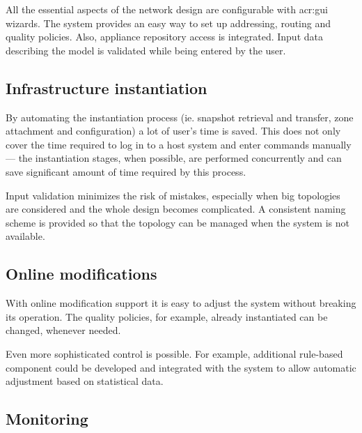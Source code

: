 \documentclass[11pt]{book}
\begin{document}
        All the essential aspects of the network design are configurable with \gls{acr:gui} wizards. The system provides an easy
        way to set up addressing, routing and quality policies. Also, appliance repository access is integrated. Input
        data describing the model is validated while being entered by the user. 


      \subsection{Infrastructure instantiation}
      \label{sub:uc:enhance:instantiation}

        By automating the instantiation process (ie. snapshot retrieval and transfer, zone attachment and configuration)
        a lot of user's time is saved. This does not only cover the time required to log in to a host system and enter
        commands manually --- the instantiation stages, when possible, are performed concurrently and can save
        significant amount of time required by this process.

        Input validation minimizes the risk of mistakes, especially when big topologies are considered and the whole
        design becomes complicated. A consistent naming scheme is provided so that the topology can be managed when the
        system is not available.



      \subsection{Online modifications}
      \label{sub:uc:enhance:online}

        With online modification support it is easy to adjust the system without breaking its operation. The quality
        policies, for example, already instantiated can be changed, whenever needed.

        Even more sophisticated control is possible. For example, additional rule-based component could be developed and
        integrated with the system to allow automatic adjustment based on statistical data.


      \subsection{Monitoring}
      \label{sub:uc:enhance:monitoring}
\end{document}
